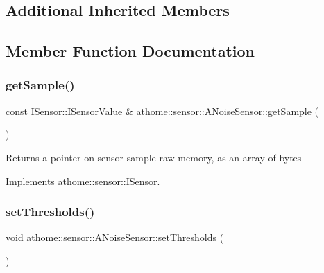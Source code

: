 \subsection*{Additional Inherited Members}


\subsection{Member Function Documentation}
\mbox{\label{classathome_1_1sensor_1_1_a_noise_sensor_ab567b050b41bd0b72fcc9b94b9f6fc6e}} 
\subsubsection{\texorpdfstring{get\+Sample()}{getSample()}}
{\footnotesize\ttfamily const \mbox{\hyperlink{structathome_1_1sensor_1_1_i_sensor_1_1_i_sensor_value}{I\+Sensor\+::\+I\+Sensor\+Value}} \& athome\+::sensor\+::\+A\+Noise\+Sensor\+::get\+Sample (\begin{DoxyParamCaption}{ }\end{DoxyParamCaption})\hspace{0.3cm}{\ttfamily [virtual]}}

Returns a pointer on sensor sample raw memory, as an array of bytes 

Implements \mbox{\hyperlink{classathome_1_1sensor_1_1_i_sensor_ae109cd3741ea9c88dc7e4f2eaf1485d5}{athome\+::sensor\+::\+I\+Sensor}}.

\mbox{\label{classathome_1_1sensor_1_1_a_noise_sensor_a8429e91e9f8b2e1634a405780f456beb}} 
\subsubsection{\texorpdfstring{set\+Thresholds()}{setThresholds()}}
{\footnotesize\ttfamily void athome\+::sensor\+::\+A\+Noise\+Sensor\+::set\+Thresholds (\begin{DoxyParamCaption}\item[{const \mbox{\hyperlink{structathome_1_1sensor_1_1_i_sensor_1_1_i_sensor_thresholds}{I\+Sensor\+Thresholds}} \&}]{ }\end{DoxyParamCaption})\hspace{0.3cm}{\ttfamily [virtual]}}

